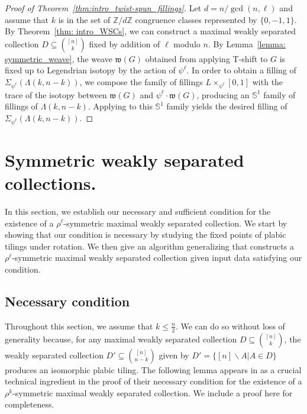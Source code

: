 \documentclass[11pt]{amsart}
\newcommand{\La}{\Lambda}
\newcommand{\Z}{\mathbb{Z}}
\newcommand{\w}{\mathfrak{w}}
\renewcommand{\S}{\mathbb{S}}
\theoremstyle{plain}
\theoremstyle{definition}
\begin{document}
\begin{proof}[Proof of Theorem~\ref{thm:intro_twist-spun_fillings}]
Let $d=n/\gcd(n, \ell)$ and assume that $k$ is in the set of $\Z/d\Z$ congruence classes represented by $\{0, -1, 1\}$. By Theorem~\ref{thm: intro_WSCs}, we can construct a maximal weakly separated collection $D\subseteq {[n] \choose k}$ fixed by addition of $\ell$ modulo $n$. By Lemma~\ref{lemma: symmetric_weave}, the weave $\w(G)$ obtained from applying T-shift to $G$ is fixed up to Legendrian isotopy by the action of $\psi^\ell$. In order to obtain a filling of $\Sigma_{\psi^\ell}(\La(k, n-k))$, we compose the family of fillings $L\times_{\psi^\ell}[0, 1]$ with the trace of the isotopy between $\w(G)$ and $\psi^\ell\cdot \w(G)$, producing an $\S^1$ family of fillings of $\La(k, n-k)$. Applying \cite[Proposition 6.2]{HughesRoy} to this $\S^1$ family yields the desired filling of $\Sigma_{\psi^\ell}(\La(k, n-k))$.
\end{proof}




\section{Symmetric weakly separated collections.}\label{sec: algorithm}

In this section, we establish our necessary and sufficient condition for the existence of a $\rho^\ell$-symmetric maximal weakly separated collection. We start by showing that our condition is necessary by studying the fixed points of plabic tilings under rotation. We then give an algorithm generalizing \cite[Theorem 1.6]{PasqTZ2019} that constructs a $\rho^\ell$-symmetric maximal weakly separated collection given input data satisfying our condition.

\subsection{Necessary condition}
Throughout this section, we assume that $k\leq \frac{n}{2}$. We can do so without loss of generality because, for any maximal weakly separated collection $D\subseteq{[n]\choose k}$, the weakly separated collection $D'\subseteq{[n] \choose n-k}$ given by $D'=\{[n]\backslash A|  A \in D\}$ produces an isomorphic plabic tiling. The following lemma appears in \cite{PasqTZ2019} as a crucial technical ingredient in the proof of their necessary condition for the existence of a $\rho^k$-symmetric maximal weakly separated collection. We include a proof here for completeness.
\end{document}
